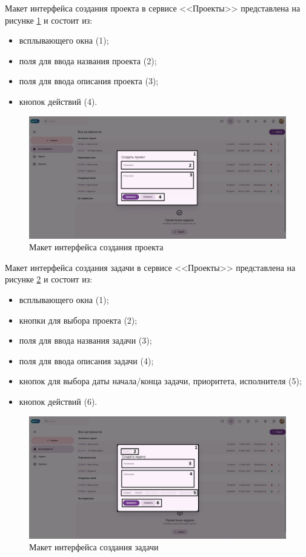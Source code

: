 Макет интерфейса создания проекта в сервисе <<Проекты>> представлена на рисунке \ref{templ:image7b} и состоит из:
\begin{itemize}
  \item всплывающего окна (1);
  \item поля для ввода названия проекта (2);
  \item поля для ввода описания проекта (3);
  \item кнопок действий (4).
\end{itemize}
\begin{figure}[H]
	\centering
	\includegraphics[width=1\linewidth]{images/проекты2}
	\caption{Макет интерфейса создания проекта}
	\label{templ:image7b}
\end{figure}

Макет интерфейса создания задачи в сервисе <<Проекты>> представлена на рисунке \ref{templ:image7c} и состоит из:
\begin{itemize}
  \item всплывающего окна (1);
  \item кнопки для выбора проекта (2);
  \item поля для ввода названия задачи (3);
  \item поля для ввода описания задачи (4);
  \item кнопок для выбора даты начала/конца задачи, приоритета, исполнителя (5);
  \item кнопок действий (6).
\end{itemize}
\begin{figure}[H]
	\centering
	\includegraphics[width=1\linewidth]{images/проекты3}
	\caption{Макет интерфейса создания задачи}
	\label{templ:image7c}
\end{figure}


